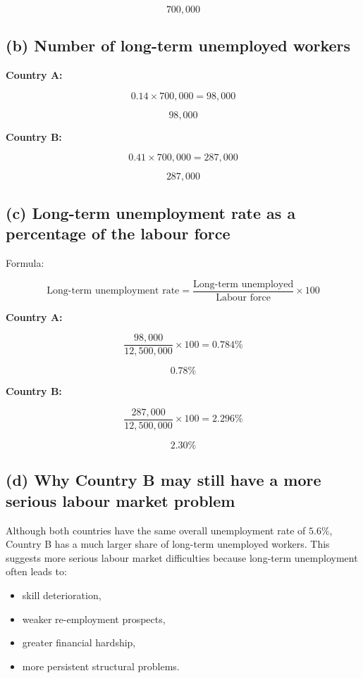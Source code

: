 \documentclass[12pt]{article}
\begin{document}
\[
\boxed{700{,}000}
\]

\subsection*{(b) Number of long-term unemployed workers}

\textbf{Country A:}

\[
0.14 \times 700{,}000 = 98{,}000
\]

\[
\boxed{98{,}000}
\]

\textbf{Country B:}

\[
0.41 \times 700{,}000 = 287{,}000
\]

\[
\boxed{287{,}000}
\]

\subsection*{(c) Long-term unemployment rate as a percentage of the labour force}

Formula:

\[
\text{Long-term unemployment rate}=\frac{\text{Long-term unemployed}}{\text{Labour force}}\times 100
\]

\textbf{Country A:}

\[
\frac{98{,}000}{12{,}500{,}000}\times 100 = 0.784\%
\]

\[
\boxed{0.78\%}
\]

\textbf{Country B:}

\[
\frac{287{,}000}{12{,}500{,}000}\times 100 = 2.296\%
\]

\[
\boxed{2.30\%}
\]

\subsection*{(d) Why Country B may still have a more serious labour market problem}

Although both countries have the same overall unemployment rate of \(5.6\%\), Country B has a much larger share of long-term unemployed workers. This suggests more serious labour market difficulties because long-term unemployment often leads to:

\begin{itemize}
    \item skill deterioration,
    \item weaker re-employment prospects,
    \item greater financial hardship,
    \item more persistent structural problems.
\end{itemize}
\end{document}
